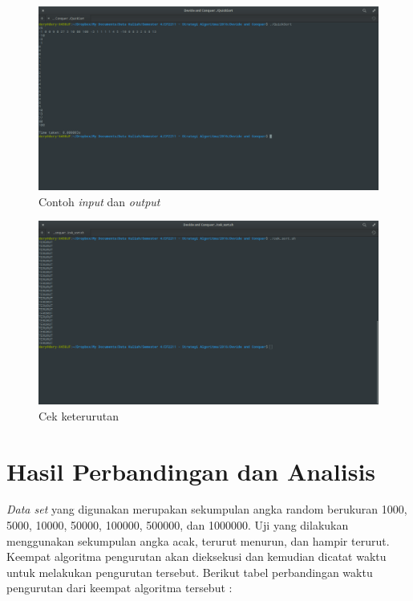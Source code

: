 \documentclass{article}
\begin{document}
	\begin{figure}[h]
	\vspace*{-0.2in}
		\centerline{\includegraphics[width=\linewidth]{images/input-output.png}}
		\caption{Contoh \textit{input} dan \textit{output}}
	\end{figure}
	\clearpage
	\begin{figure}[h]
	\vspace*{-0.2in}
		\centerline{\includegraphics[width=\linewidth]{images/cek.png}}
		\caption{Cek keterurutan}
	\end{figure}

	\clearpage
	\section{Hasil Perbandingan dan Analisis}
	\par \textit{Data set} yang digunakan merupakan sekumpulan angka random berukuran 1000, 5000, 10000, 50000, 100000, 500000, dan 1000000. Uji yang dilakukan menggunakan sekumpulan angka acak, terurut menurun, dan hampir terurut. Keempat algoritma pengurutan akan dieksekusi dan kemudian dicatat waktu untuk melakukan pengurutan tersebut. Berikut tabel perbandingan waktu pengurutan dari keempat algoritma tersebut :
	
\end{document}
